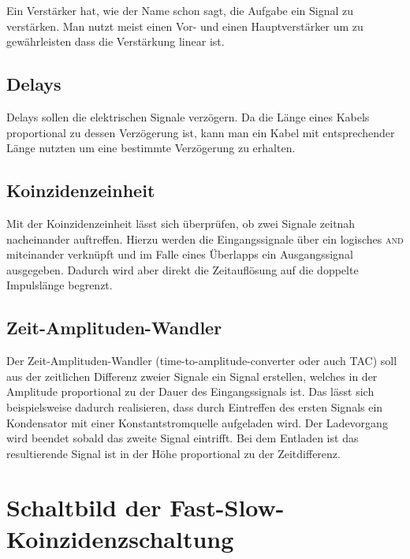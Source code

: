 \documentclass[11pt, ngerman, fleqn, DIV=15, headinclude, BCOR=2cm]{scrreprt}
\begin{document}
Ein Verstärker hat, wie der Name schon sagt, die Aufgabe ein Signal zu
verstärken. Man nutzt meist einen Vor- und einen Hauptverstärker um zu
gewährleisten dass die Verstärkung linear ist. 

\subsection{Delays}

Delays sollen die elektrischen Signale verzögern. Da die Länge eines Kabels
proportional zu dessen Verzögerung ist, kann man ein Kabel mit entsprechender
Länge nutzten um eine bestimmte Verzögerung zu erhalten.

\subsection{Koinzidenzeinheit}

Mit der Koinzidenzeinheit lässt sich überprüfen, ob zwei Signale zeitnah
nacheinander auftreffen. Hierzu werden die Eingangssignale über ein logisches
\textsc{and} miteinander verknüpft und im Falle eines Überlapps ein Ausgangssignal
ausgegeben. Dadurch wird aber direkt die Zeitauflösung auf die doppelte
Impulslänge begrenzt.

\subsection{Zeit-Amplituden-Wandler}

Der Zeit-Amplituden-Wandler (time-to-amplitude-converter oder auch TAC) soll
aus der zeitlichen Differenz zweier Signale ein Signal erstellen, welches
in der Amplitude proportional zu der Dauer des Eingangssignals ist. Das lässt
sich beispielsweise dadurch realisieren, dass durch Eintreffen des ersten
Signals ein Kondensator mit einer Konstantstromquelle
aufgeladen wird. Der Ladevorgang wird beendet sobald das zweite Signal
eintrifft. Bei dem Entladen ist das resultierende Signal ist in der Höhe
proportional zu der Zeitdifferenz.

\section{Schaltbild der Fast-Slow-Koinzidenzschaltung}
\end{document}
